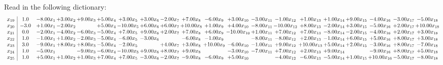 \documentclass[9pt]{article}
\begin{document}
Read in the following dictionary:
\[\begin{array}{c| c c@{\hskip 2pt} c@{\hskip 2pt} c@{\hskip 2pt} c@{\hskip 2pt} c@{\hskip 2pt} c@{\hskip 2pt} c@{\hskip 2pt} c@{\hskip 2pt} c@{\hskip 2pt} c@{\hskip 2pt} c@{\hskip 2pt} c@{\hskip 2pt} c@{\hskip 2pt} c@{\hskip 2pt} c@{\hskip 2pt} c@{\hskip 2pt} c@{\hskip 2pt} c@{\hskip 2pt} }
 x_{19}   &  1.0 & -8.00 x_{1} & +  3.00 x_{2} & +  9.00 x_{3} & +  5.00 x_{4} & +  3.00 x_{5} & +  3.00 x_{6} & -2.00 x_{7} & +  7.00 x_{8} & -6.00 x_{9} & +  3.00 x_{10} & -3.00 x_{11} & -1.00 x_{12} & +  1.00 x_{13} & +  1.00 x_{14} & +  9.00 x_{15} & -4.00 x_{16} & -3.00 x_{17} & -5.00 x_{18}\\
 x_{20}   &  -3.0 & +  1.00 x_{1} & -2.00 x_{2} &   & +  5.00 x_{4} & -10.00 x_{5} & +  6.00 x_{6} & +  6.00 x_{7} & + 10.00 x_{8} & +  1.00 x_{9} & +  4.00 x_{10} & -8.00 x_{11} & -10.00 x_{12} & +  8.00 x_{13} & -2.00 x_{14} & +  3.00 x_{15} & -5.00 x_{16} & +  2.00 x_{17} & + 10.00 x_{18}\\
 x_{21}   &  0.0 & -2.00 x_{1} & -4.00 x_{2} & -6.00 x_{3} & -5.00 x_{4} & +  7.00 x_{5} & +  9.00 x_{6} & +  2.00 x_{7} & +  7.00 x_{8} & +  6.00 x_{9} & -10.00 x_{10} & +  1.00 x_{11} & +  7.00 x_{12} & +  7.00 x_{13} & -8.00 x_{14} & -2.00 x_{15} & -4.00 x_{16} & +  2.00 x_{17} & +  3.00 x_{18}\\
 x_{22}   &  1.0 & -1.00 x_{1} & +  1.00 x_{2} & -2.00 x_{3} & -5.00 x_{4} & -6.00 x_{5} & -3.00 x_{6} &   & -6.00 x_{8} & -1.00 x_{9} &   & -8.00 x_{11} & -8.00 x_{12} & +  2.00 x_{13} & -1.00 x_{14} & +  6.00 x_{15} & +  5.00 x_{16} & +  8.00 x_{17} & +  3.00 x_{18}\\
 x_{23}   &  3.0 & -9.00 x_{1} & +  8.00 x_{2} & +  8.00 x_{3} & -5.00 x_{4} & -2.00 x_{5} &   & +  4.00 x_{7} & +  3.00 x_{8} & + 10.00 x_{9} & -6.00 x_{10} & -1.00 x_{11} & +  9.00 x_{12} & + 10.00 x_{13} & +  5.00 x_{14} & +  2.00 x_{15} & -3.00 x_{16} & +  8.00 x_{17} & -7.00 x_{18}\\
 x_{24}   &  1.0 & -5.00 x_{1} &   & -9.00 x_{3} & -6.00 x_{4} & -10.00 x_{5} & +  9.00 x_{6} & +  8.00 x_{7} & +  9.00 x_{8} &   & -3.00 x_{10} & -7.00 x_{11} & +  7.00 x_{12} & +  2.00 x_{13} & +  9.00 x_{14} &   & -9.00 x_{16} & +  8.00 x_{17} & +  5.00 x_{18}\\
 x_{25}   &  1.0 & +  5.00 x_{1} & +  1.00 x_{2} & +  1.00 x_{3} & +  7.00 x_{4} & +  7.00 x_{5} & -3.00 x_{6} & -2.00 x_{7} & -9.00 x_{8} & -6.00 x_{9} & +  5.00 x_{10} &   & -4.00 x_{12} & -6.00 x_{13} & -5.00 x_{14} & +  1.00 x_{15} & + 10.00 x_{16} & -5.00 x_{17} & -8.00 x_{18}\\

\end{array}\]
\end{document}
